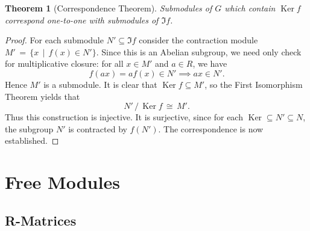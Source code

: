 \documentclass[11pt]{article}
\newtheorem{theorem}{Theorem}
\newcommand{\Ker}{\operatorname{Ker}}
\begin{document}
\begin{adjustwidth}{0.5cm}{}
  \begin{theorem}[Correspondence Theorem]
    Submodules of $G$ which contain $\Ker f$ correspond one-to-one with submodules of $\Im f$.
  \end{theorem}
  \begin{proof}
    For each submodule $N' \subseteq \Im f$ consider the contraction module $M' \, = \, \{ x \, \mid \, f(x) \in N' \}$. Since this is an Abelian subgroup, we need only check for multiplicative closure: for all $x \in M'$ and $a \in R$, we have
    \[
      f(ax) = a f(x) \in N' \implies ax \in N'.
    \]
    Hence $M'$ is a submodule. It is clear that $\Ker f \subseteq M'$, so the First Isomorphism Theorem yields that
    \[
      N' \, / \, \Ker f \, \cong \, M'.
    \]
    Thus this construction is injective. It is surjective, since for each $\Ker \subseteq N' \subseteq N$, the subgroup $N'$ is contracted by $f(N')$. The correspondence is now established.
  \end{proof}
\end{adjustwidth}


\section{Free Modules}


\subsection{R-Matrices}
\end{document}
